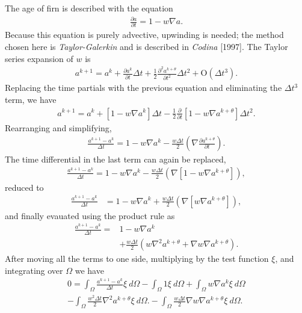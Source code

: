 \documentclass{article}%
\begin{document}
The age of firn is described with the equation
\begin{align*}
  \frac{\partial a}{\partial t} = 1 - w \nabla{a}.
\end{align*}
Because this equation is purely advective, upwinding is needed; the method chosen here is \emph{Taylor-Galerkin} and is described in \emph{Codina} [1997].  The Taylor series expansion of $w$ is
\begin{align*}
  a^{k+1} = a^{k} + \frac{\partial a^k}{\partial t}\Delta t + 
            \frac{1}{2}\frac{\partial^2 a^{k+\theta}}{\partial t^2}\Delta t^2 + 
            \mathrm{O} (\Delta t^3).
\end{align*}
Replacing the time partials with the previous equation and eliminating the $\Delta t^3$ term, we have
\begin{align*}
  a^{k+1} = a^{k} + \left[1 - w \nabla{a}^k \right] \Delta t
            - \frac{1}{2}\frac{\partial}{\partial t}
              \left[1 - w \nabla{a}^{k+\theta} \right] \Delta t^2. 
\end{align*}
Rearranging and simplifying,
\begin{align*}
  \frac{a^{k+1} - a^{k}}{\Delta t} = 1 - w \nabla{a}^k
        - \frac{w \Delta t}{2} 
          \left( \nabla \frac{\partial a^{k+\theta}}{\partial t} \right).
\end{align*}
The time differential in the last term can again be replaced, 
\begin{align*}
  \frac{a^{k+1} - a^{k}}{\Delta t} = 1 - w \nabla{a}^k
        - \frac{w \Delta t}{2} 
          \left( \nabla [1 - w \nabla a^{k+\theta}] \right),
\end{align*}
reduced to
\begin{align*}
  \frac{a^{k+1} - a^{k}}{\Delta t} &= 1 - w \nabla{a}^k
        + \frac{w \Delta t}{2} 
          \left( \nabla [w \nabla a^{k+\theta}] \right),
\end{align*}
and finally evauated using the product rule as
\begin{align*}
  \frac{a^{k+1} - a^{k}}{\Delta t} = &1 - w \nabla{a}^k\\
        &+ \frac{w \Delta t}{2} 
          \left( w \nabla^2 a^{k+\theta} + \nabla w \nabla a^{k+\theta} \right).
\end{align*}
After moving all the terms to one side, multiplying by the test function $\xi$, and integrating over $\Omega$ we have
\begin{align*}
  0 = \int_{\Omega} \frac{a^{k+1} - a^{k}}{\Delta t}\xi\ d\Omega - 
      \int_{\Omega} 1\xi\ d\Omega
  + \int_{\Omega} w \nabla{a}^k \xi\ d\Omega \\
  - \int_{\Omega} \frac{w^2 \Delta t}{2} 
    \nabla^2 a^{k+\theta} \xi\ d\Omega.
  - \int_{\Omega} \frac{w \Delta t}{2} 
    \nabla w \nabla a^{k+\theta} \xi\ d\Omega. \\
\end{align*}
\end{document}

